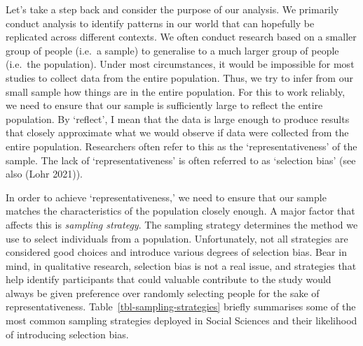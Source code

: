 \documentclass[
  letterpaper,
  DIV=11,
  numbers=noendperiod]{scrreprt}
\begin{document}
Let's take a step back and consider the purpose of our analysis. We
primarily conduct analysis to identify patterns in our world that can
hopefully be replicated across different contexts. We often conduct
research based on a smaller group of people (i.e.~a sample) to
generalise to a much larger group of people (i.e.~the population). Under
most circumstances, it would be impossible for most studies to collect
data from the entire population. Thus, we try to infer from our small
sample how things are in the entire population. For this to work
reliably, we need to ensure that our sample is sufficiently large to
reflect the entire population. By `reflect', I mean that the data is
large enough to produce results that closely approximate what we would
observe if data were collected from the entire population. Researchers
often refer to this as the `representativeness' of the sample. The lack
of `representativeness' is often referred to as `selection bias' (see
also (Lohr 2021)).

In order to achieve `representativeness,' we need to ensure that our
sample matches the characteristics of the population closely enough. A
major factor that affects this is \emph{sampling strategy}. The sampling
strategy determines the method we use to select individuals from a
population. Unfortunately, not all strategies are considered good
choices and introduce various degrees of selection bias. Bear in mind,
in qualitative research, selection bias is not a real issue, and
strategies that help identify participants that could valuable
contribute to the study would always be given preference over randomly
selecting people for the sake of representativeness.
Table~\ref{tbl-sampling-strategies} briefly summarises some of the most
common sampling strategies deployed in Social Sciences and their
likelihood of introducing selection bias.

\begingroup
\fontsize{9.0pt}{10.8pt}\selectfont
\end{document}
